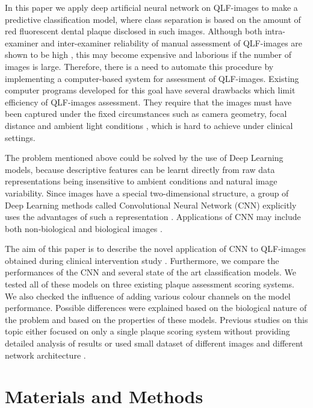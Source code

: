 \documentclass[runningheads,a4paper]{llncs}
\begin{document}
In this paper we apply deep artificial neural network on QLF-images to make a predictive classification model, where class separation is based on the amount of red fluorescent dental plaque disclosed in such images. Although both intra-examiner and inter-examiner reliability of manual assessment of QLF-images are shown to be high \cite{volgenant2016comparison}, this may become expensive and laborious if the number of images is large. Therefore, there is a need to automate this procedure by implementing a computer-based system for assessment of QLF-images. Existing computer programs developed for this goal have several drawbacks which limit efficiency of QLF-images assessment. They require that the images must have been captured under the fixed circumstances such as camera geometry, focal distance and ambient light conditions \cite{kim2014monitoring}, which is hard to achieve under clinical settings.

The problem mentioned above could be solved by the use of Deep Learning models, because descriptive features can be learnt directly from raw data representations \cite{LeCun2015} being insensitive to ambient conditions and natural image variability. Since images have a special two-dimensional structure, a group of Deep Learning methods called Convolutional Neural Network (CNN) explicitly uses the advantages of such a representation \cite{jarrett2009best,lecun2010convolutional}. Applications of CNN may include both non-biological \cite{david2016deeppainter} and biological images \cite{esteva2017dermatologist}.

The aim of this paper is to describe the novel application of CNN to QLF-images obtained during clinical intervention study \cite{van2016dynamics}. Furthermore, we compare the performances of the CNN and several state of the art classification models. We tested all of these models on three existing plaque assessment scoring systems. We also checked the influence of adding various colour channels on the model performance. Possible differences were explained based on the biological nature of the problem and based on the properties of these models. Previous studies on this topic either focused on only a single plaque scoring system without providing detailed analysis of results \cite{imangaliyev2016deep} or used small dataset of different images and different network architecture \cite{kang2006dental}.

\section{Materials and Methods}
\end{document}
